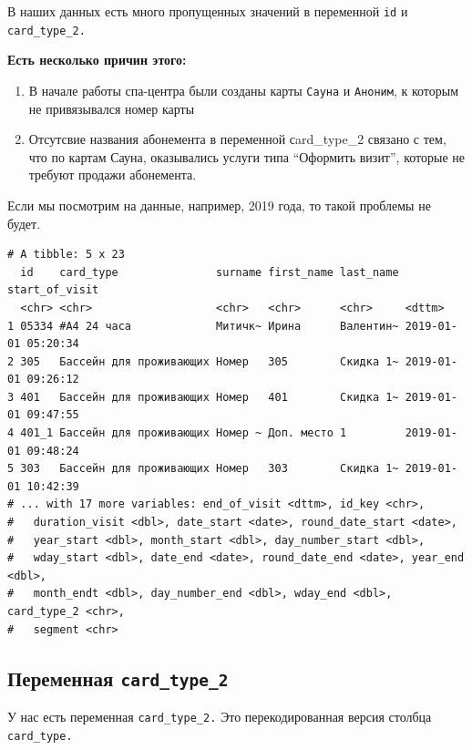\documentclass[
  letterpaper,
  DIV=11,
  numbers=noendperiod]{scrreprt}
\begin{document}
В наших данных есть много пропущенных значений в переменной \texttt{id}
и \texttt{сard\_type\_2.}

\textbf{Есть несколько причин этого:}

\begin{enumerate}
\def\labelenumi{\arabic{enumi}.}
\item
  В начале работы спа-центра были созданы карты \texttt{Сауна} и
  \texttt{Аноним}, к которым не привязывался номер карты
\item
  Отсутсвие названия абонемента в переменной сard\_type\_2 связано с
  тем, что по картам Сауна, оказывались услуги типа ``Оформить визит'',
  которые не требуют продажи абонемента.
\end{enumerate}

Если мы посмотрим на данные, например, 2019 года, то такой проблемы не
будет.

\begin{verbatim}
# A tibble: 5 x 23
  id    сard_type               surname first_name last_name start_of_visit     
  <chr> <chr>                   <chr>   <chr>      <chr>     <dttm>             
1 05334 #А4 24 часа             Митичк~ Ирина      Валентин~ 2019-01-01 05:20:34
2 305   Бассейн для проживающих Номер   305        Скидка 1~ 2019-01-01 09:26:12
3 401   Бассейн для проживающих Номер   401        Скидка 1~ 2019-01-01 09:47:55
4 401_1 Бассейн для проживающих Номер ~ Доп. место 1         2019-01-01 09:48:24
5 303   Бассейн для проживающих Номер   303        Скидка 1~ 2019-01-01 10:42:39
# ... with 17 more variables: end_of_visit <dttm>, id_key <chr>,
#   duration_visit <dbl>, date_start <date>, round_date_start <date>,
#   year_start <dbl>, month_start <dbl>, day_number_start <dbl>,
#   wday_start <dbl>, date_end <date>, round_date_end <date>, year_end <dbl>,
#   month_endt <dbl>, day_number_end <dbl>, wday_end <dbl>, сard_type_2 <chr>,
#   segment <chr>
\end{verbatim}

\hypertarget{ux43fux435ux440ux435ux43cux435ux43dux43dux430ux44f-ux441ard_type_2}{%
\subsection*{\texorpdfstring{Переменная
\texttt{сard\_type\_2}}{Переменная сard\_type\_2}}\label{ux43fux435ux440ux435ux43cux435ux43dux43dux430ux44f-ux441ard_type_2}}

У нас есть переменная \texttt{сard\_type\_2.} Это перекодированная
версия столбца \texttt{сard\_type.}
\end{document}
